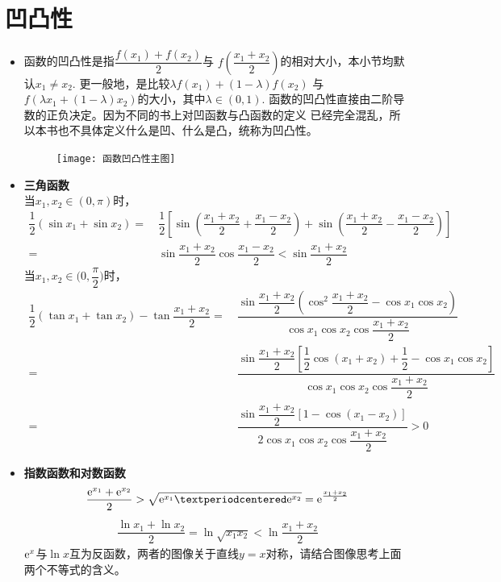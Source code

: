 \section{凹凸性}
\begin{itemize}[leftmargin=\inteval{\myitemleftmargin}pt,itemsep=
   \inteval{\myitemitempsep}pt,topsep=\inteval{\myitemtopsep}pt]

\item 函数的凹凸性是指$ \dfrac{f(x_1)+f(x_2)}{2} $与
$ f\left(\dfrac{x_1+x_2}{2}\right) $的相对大小，本小节均默认$ x_1 \neq x_2 $. 
更一般地，是比较$ \lambda f(x_1)+(1-\lambda)f(x_2) $ 
与$ f(\lambda x_1+(1-\lambda)x_2) $的大小，其中$ \lambda \in (0,1) $. 
函数的凹凸性直接由二阶导数的正负决定。因为不同的书上对凹函数与凸函数的定义
已经完全混乱，所以本书也不具体定义什么是凹、什么是凸，统称为凹凸性。
\begin{figure}[H]
    \centering
    \texttt{[image: 函数凹凸性主图]}
\end{figure}

\item \textbf{三角函数} \\
当$ x_1,x_2\in (0,\pi) $时，
\begin{align*}
    \dfrac{1}{2} \left(\sin x_1 + \sin x_2 \right) =&\ 
    \dfrac{1}{2} \left[ \sin \left(\dfrac{x_1+x_2}{2}+\dfrac{x_1-x_2}{2}\right)  + 
    \sin \left(\dfrac{x_1+x_2}{2}-\dfrac{x_1-x_2}{2}\right) \right] \\
    =&\  \sin \dfrac{x_1+x_2}{2} \cos \dfrac{x_1-x_2}{2} 
     < \sin \dfrac{x_1+x_2}{2}
\end{align*}
当$ x_1,x_2\in \Big(0,\dfrac{\pi}{2}\Big) $时，
\begin{align*}
    \dfrac{1}{2}\left(\tan x_1+\tan x_2\right)-\tan\dfrac{x_1+x_2}{2}
    =&\  \dfrac{\sin\dfrac{x_1+x_2}{2}\left(\cos^2\dfrac{x_1+x_2}{2}
        -\cos x_1\cos x_2 \right)}{\cos x_1\cos x_2 \cos\dfrac{x_1+x_2}{2}}  \\
    =&\  \dfrac{\sin\dfrac{x_1+x_2}{2}\left[\dfrac{1}{2}
        \cos(x_1+x_2)+\dfrac{1}{2}
        -\cos x_1\cos x_2 \right]}{\cos x_1\cos x_2 \cos\dfrac{x_1+x_2}{2}}  \\        
    =&\  \dfrac{\sin\dfrac{x_1+x_2}{2}\left[1-\cos(x_1-x_2) \right]}
    {2\cos x_1\cos x_2 \cos\dfrac{x_1+x_2}{2}} >0
\end{align*}

\item \textbf{指数函数和对数函数} 
\begin{align*}
    \dfrac{\e^{x_1}+\e^{x_2}}{2}>\sqrt{\e^{x_1}·\e^{x_2}}=
    \e^{\frac{x_1+x_2}{2}}
\end{align*}
\begin{align*}
    \dfrac{\ln x_1+\ln x_2}{2}=\ln \sqrt{x_1 x_2}<\ln\dfrac{x_1+x_2}{2}
\end{align*}
$ \mathrm{e}^x $与$ \ln x $互为反函数，两者的图像关于直线$ y=x $对称，请结合图像思考上面两个不等式的含义。


\end{itemize}

